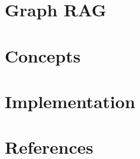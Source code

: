 % 

\section[Graph RAG]{Graph RAG}



\section[Con]{Concepts}



\section[Impl]{Implementation}


\section[Refs]{References}
